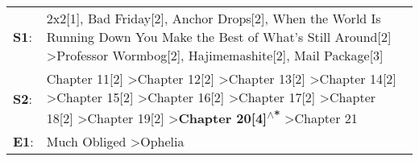 \begin{supertabular}{p{0.03\textwidth}p{0.92\textwidth}}
 \textbf{S1}:  &                                                                                                                                                                                                                                 2x2[1]\textsuperscript{}, \enspace Bad Friday[2]\textsuperscript{}, \enspace Anchor Drops[2]\textsuperscript{}, \enspace When the World Is Running Down You Make the Best of What's Still Around[2]\textsuperscript{} \textgreater \enspace Professor Wormbog[2]\textsuperscript{}, \enspace Hajimemashite[2]\textsuperscript{}, \enspace Mail Package[3]\textsuperscript{}  \enspace  \\
 \textbf{S2}:  &  Chapter 11[2]\textsuperscript{} \textgreater \enspace Chapter 12[2]\textsuperscript{} \textgreater \enspace Chapter 13[2]\textsuperscript{} \textgreater \enspace Chapter 14[2]\textsuperscript{} \textgreater \enspace Chapter 15[2]\textsuperscript{} \textgreater \enspace Chapter 16[2]\textsuperscript{} \textgreater \enspace Chapter 17[2]\textsuperscript{} \textgreater \enspace Chapter 18[2]\textsuperscript{} \textgreater \enspace Chapter 19[2]\textsuperscript{} \textgreater \enspace \textbf{Chapter 20[4]\textsuperscript{$\wedge$*}} \textgreater \enspace Chapter 21\textsuperscript{}  \enspace  \\
 \textbf{E1}:  &                                                                                                                                                                                                                                                                                                                                                                                                                                                                                                                              Much Obliged\textsuperscript{} \textgreater \enspace Ophelia\textsuperscript{}  \enspace  \\
\end{supertabular}

